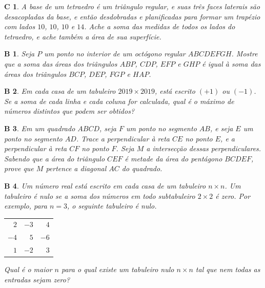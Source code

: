 \documentclass[12pt,a4paper]{scrartcl}
\theoremstyle{wonamestylealt}
\newtheorem{probc}{C}
\newtheorem{probb}{B}
\begin{document}
	\begin{probc}
		A base de um tetraedro é um triângulo regular, e suas três faces laterais são desacopladas da base, e então desdobradas e planificadas para formar um trapézio com lados \(10\), \(10\), \(10\) e \(14\). Ache a soma das medidas de todos os lados do tetraedro, e ache também a área de sua superfície.
	\end{probc}

	\setcounter{probb}{5037}
	\begin{probb}
		Seja \(P\) um ponto no interior de um octógono regular \(ABCDEFGH\). Mostre que a soma das áreas dos triângulos \(ABP\), \(CDP\), \(EFP\) e \(GHP\) é igual à soma das áreas dos triângulos \(BCP\), \(DEP\), \(FGP\) e \(HAP\).
	\end{probb}

	\begin{probb}
		Em cada casa de um tabuleiro \(2019 \times 2019\), está escrito \((+1)\) ou \((-1)\). Se a soma de cada linha e cada coluna for calculada, qual é o máximo de números distintos que podem ser obtidos?
	\end{probb}

	\begin{probb}
		Em um quadrado \(ABCD\), seja \(F\) um ponto no segmento \(AB\), e seja \(E\) um ponto no segmento \(AD\). Trace a perpendicular à reta \(CE\) no ponto \(E\), e a perpendicular à reta \(CF\) no ponto \(F\). Seja \(M\) a intersecção dessas perpendiculares. Sabendo que a área do triângulo \(CEF\) é metade da área do pentágono \(BCDEF\), prove que \(M\) pertence a diagonal \(AC\) do quadrado.
	\end{probb}

	\begin{probb}
		Um número real está escrito em cada casa de um tabuleiro \(n \times n\). Um tabuleiro é \emph{nulo} se a soma dos números em todo subtabuleiro \(2 \times 2\) é zero. Por exemplo, para \(n = 3\), o seguinte tabuleiro é nulo.
		\begin{center}
			\begin{tabular}{rrr}
				\(2\) & \(-3\) & \(4\) \\
				\(-4\) & \(5\) & \(-6 \) \\
				\(1\) & \(-2\) & \(3\) 
			\end{tabular}
		\end{center}

		Qual é o maior \(n\) para o qual existe um tabuleiro nulo \(n \times n\) tal que nem todas as entradas sejam zero?
	\end{probb}
\end{document}
